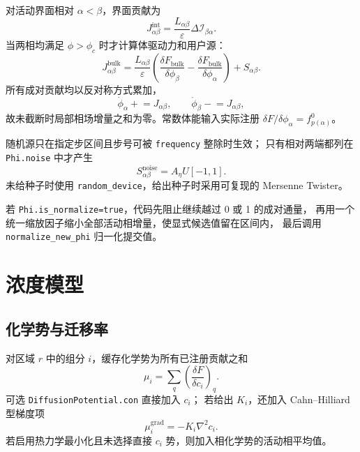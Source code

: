 \documentclass[UTF8,a4paper,11pt]{ctexart}
\newcommand{\code}[1]{\texttt{#1}}
\begin{document}
对活动界面相对 $\alpha<\beta$，界面贡献为
\begin{equation}
 J_{\alpha\beta}^{\mathrm{int}}
 =\frac{L_{\alpha\beta}}{\varepsilon}\Delta\mathcal I_{\beta\alpha}.
\end{equation}
当两相均满足 $\phi>\phi_c$ 时才计算体驱动力和用户源：
\begin{equation}
 J_{\alpha\beta}^{\mathrm{bulk}}
 =\frac{L_{\alpha\beta}}{\varepsilon}
 \left(\frac{\delta F_{\mathrm{bulk}}}{\delta\phi_\beta}
      -\frac{\delta F_{\mathrm{bulk}}}{\delta\phi_\alpha}\right)
 +S_{\alpha\beta}.
\end{equation}
所有成对贡献均以反对称方式累加，
\begin{equation}
 \dot\phi_\alpha\mathrel{+}=J_{\alpha\beta},\qquad
 \dot\phi_\beta\mathrel{-}=J_{\alpha\beta},
 \label{eq:pairwise}
\end{equation}
故未截断时局部相场增量之和为零。常数体能输入实际注册
$\delta F/\delta\phi_\alpha=f^0_{p(\alpha)}$。

随机源只在指定步区间且步号可被 \code{frequency} 整除时生效；
只有相对两端都列在 \code{Phi.noise} 中才产生
\begin{equation}
 S_{\alpha\beta}^{\mathrm{noise}}=A_\eta U[-1,1].
\end{equation}
未给种子时使用 \code{random\_device}，给出种子时采用可复现的 Mersenne Twister。

若 \code{Phi.is\_normalize=true}，代码先阻止继续越过 0 或 1 的成对通量，
再用一个统一缩放因子缩小全部活动相增量，使显式候选值留在区间内，
最后调用 \code{normalize\_new\_phi} 归一化提交值。

\section{浓度模型}

\subsection{化学势与迁移率}

对区域 $r$ 中的组分 $i$，缓存化学势为所有已注册贡献之和
\begin{equation}
 \mu_i=\sum_q\left(\frac{\delta F}{\delta c_i}\right)_q.
\end{equation}
可选 \code{DiffusionPotential.con} 直接加入 $c_i$；
若给出 $K_i$，还加入 Cahn--Hilliard 型梯度项
\begin{equation}
 \mu_i^{\mathrm{grad}}=-K_i\nabla^2c_i.
\end{equation}
若启用热力学最小化且未选择直接 $c_i$ 势，则加入相化学势的活动相平均值。
\end{document}

